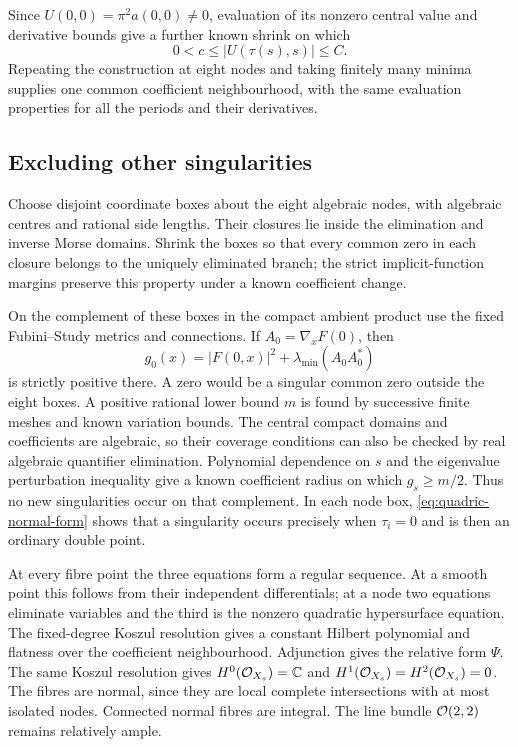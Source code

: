 Since $U(0,0)=\pi^2a(0,0)\ne0$, evaluation of its nonzero
central value and derivative bounds give a further known shrink on
which
\begin{equation}\label{eq:known-unit-bounds}
          0<c\le |U(\tau(s),s)|\le C.
\end{equation}
Repeating the construction at eight nodes and taking finitely many
minima supplies one common coefficient neighbourhood, with the same
evaluation properties for all the periods and their derivatives.

\subsection{Excluding other singularities}

Choose disjoint coordinate boxes about the eight algebraic nodes,
with algebraic centres and rational side lengths. Their closures lie
inside the elimination and inverse Morse domains. Shrink the boxes
so that every common zero in each closure belongs to the uniquely
eliminated branch; the strict implicit-function margins preserve this
property under a known coefficient change.

On the complement of these boxes in the compact ambient product use
the fixed Fubini--Study metrics and connections. If
$A_0=\nabla_xF(0)$, then
\[
        g_0(x)=|F(0,x)|^2+\lambda_{\min}(A_0A_0^*)
\]
is strictly positive there. A zero would be a singular common zero
outside the eight boxes. A positive rational lower bound $m$ is found by
successive finite meshes and known variation bounds. The central
compact domains and coefficients are algebraic, so their coverage
conditions can also be checked by real algebraic quantifier elimination.
Polynomial dependence on $s$ and the eigenvalue perturbation inequality
give a known coefficient radius on which $g_s\ge m/2$. Thus no new
singularities occur on that complement. In each node box,
\eqref{eq:quadric-normal-form} shows that a singularity occurs
precisely when $\tau_i=0$ and is then an ordinary double point.

At every fibre point the three equations form a regular sequence.
At a smooth point this follows from their independent differentials;
at a node two equations eliminate variables and the third is the
nonzero quadratic hypersurface equation. The fixed-degree Koszul
resolution gives a constant Hilbert polynomial and flatness over the
coefficient neighbourhood. Adjunction gives the relative form $\Psi$.
The same Koszul resolution gives
$H^0(\mathcal O_{X_s})=\mathbb C$ and $H^1(\mathcal O_{X_s})=H^2(\mathcal O_{X_s})=0$.
The fibres are normal, since they are local complete intersections
with at most isolated nodes. Connected normal fibres are integral.
The line bundle $\mathcal O(2,2)$ remains relatively ample.

